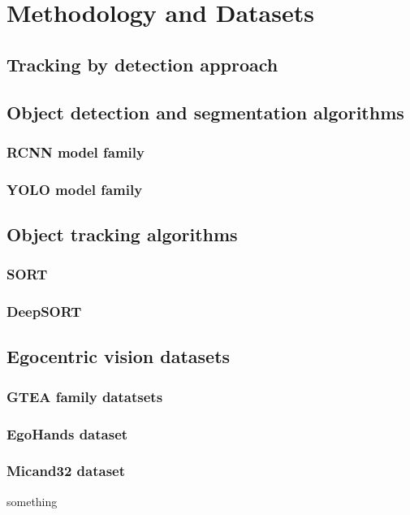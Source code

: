 \chapter{Methodology and Datasets}
\section{Tracking by detection approach}
\section{Object detection and segmentation algorithms}
\subsection{RCNN model family}
\subsection{YOLO model family}
\section{Object tracking algorithms}
\subsection{SORT}
\subsection{DeepSORT}
\section{Egocentric vision datasets}
\subsection{GTEA family datatsets}
\subsection{EgoHands dataset}
\subsection{Micand32 dataset}
something